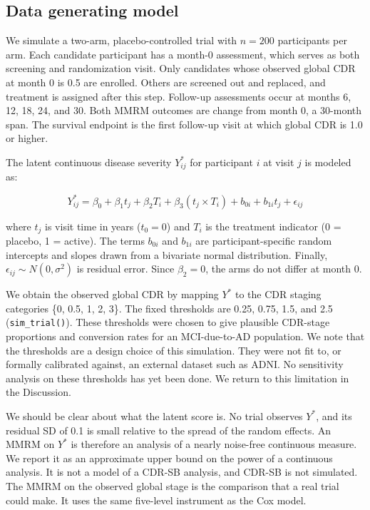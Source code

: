 \documentclass[
  11pt,
]{article}
\begin{document}
\subsection{Data generating model}\label{data-generating-model}

We simulate a two-arm, placebo-controlled trial with
\(n = 200\) participants per arm. Each candidate participant
has a month-0 assessment, which serves as both screening
and randomization visit. Only candidates whose observed
global CDR at month 0 is 0.5 are enrolled. Others are
screened out and replaced, and treatment is assigned after
this step. Follow-up assessments occur at months 6, 12,
18, 24, and 30. Both MMRM outcomes are change from
month 0, a 30-month span. The survival endpoint is the
first follow-up visit at which global CDR is 1.0 or
higher.

The latent continuous disease severity \(Y_{ij}^*\) for
participant \(i\) at visit \(j\) is modeled as:

\[Y_{ij}^* = \beta_0 + \beta_1 t_j + \beta_2 T_i
  + \beta_3 (t_j \times T_i) + b_{0i} + b_{1i} t_j
  + \epsilon_{ij}\]

where \(t_j\) is visit time in years (\(t_0 = 0\)) and \(T_i\)
is the treatment indicator (0 = placebo, 1 = active). The
terms \(b_{0i}\) and \(b_{1i}\) are participant-specific random
intercepts and slopes drawn from a bivariate normal
distribution. Finally, \(\epsilon_{ij} \sim N(0, \sigma^2)\)
is residual error. Since \(\beta_2 = 0\), the arms do not
differ at month 0.

We obtain the observed global CDR by mapping \(Y^*\) to the
CDR staging categories \{0, 0.5, 1, 2, 3\}. The fixed
thresholds are 0.25, 0.75, 1.5, and 2.5 (\texttt{sim\_trial()}).
These thresholds were chosen to give plausible CDR-stage
proportions and conversion rates for an MCI-due-to-AD
population. We note that the thresholds are a design
choice of this simulation. They were not fit to, or
formally calibrated against, an external dataset such as
ADNI. No sensitivity analysis on these thresholds has yet
been done. We return to this limitation in the
Discussion.

We should be clear about what the latent score is. No
trial observes \(Y^*\), and its residual SD of 0.1 is small
relative to the spread of the random effects. An MMRM on
\(Y^*\) is therefore an analysis of a nearly noise-free
continuous measure. We report it as an approximate upper
bound on the power of a continuous analysis. It is not a model of a
CDR-SB analysis, and CDR-SB is not simulated. The MMRM on
the observed global stage is the comparison that a real
trial could make. It uses the same five-level instrument as
the Cox model.
\end{document}

